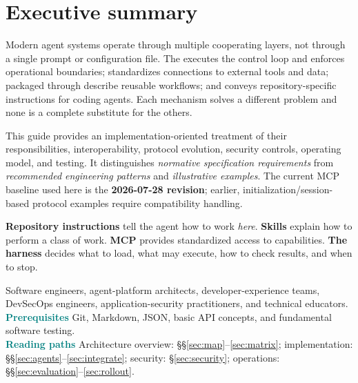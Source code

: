 \documentclass[11pt,letterpaper]{article}
\newcommand{\smallcaps}[1]{{\sffamily\bfseries\small\textcolor{Teal}{#1}}}
\begin{document}
\makedoctitle
\makedocsummary
\section*{Executive summary}
Modern agent systems operate through multiple cooperating layers, not through a single prompt or configuration file. The  executes the control loop and enforces operational boundaries;  standardizes connections to external tools and data;  packaged through  describe reusable workflows; and  conveys repository-specific instructions for coding agents. Each mechanism solves a different problem and none is a complete substitute for the others.\cite{agentsmd,agentskills,mcp2026,harnesslangchain}

This guide provides an implementation-oriented treatment of their responsibilities, interoperability, protocol evolution, security controls, operating model, and testing. It distinguishes \emph{normative specification requirements} from \emph{recommended engineering patterns} and \emph{illustrative examples}. The current MCP baseline used here is the \textbf{2026-07-28 revision}; earlier, initialization/session-based protocol examples require compatibility handling.\cite{mcp2026,mcpversion}

\begin{tipbox}
\textbf{Repository instructions} tell the agent how to work \emph{here}. \textbf{Skills} explain how to perform a class of work. \textbf{MCP} provides standardized access to capabilities. \textbf{The harness} decides what to load, what may execute, how to check results, and when to stop.
\end{tipbox}

\noindent\smallcaps{Intended readers} Software engineers, agent-platform architects, developer-experience teams, DevSecOps engineers, application-security practitioners, and technical educators.\\
\smallcaps{Prerequisites} Git, Markdown, JSON, basic API concepts, and fundamental software testing.\\
\smallcaps{Reading paths} Architecture overview: \S\S\ref{sec:map}--\ref{sec:matrix}; implementation: \S\S\ref{sec:agents}--\ref{sec:integrate}; security: \S\ref{sec:security}; operations: \S\S\ref{sec:evaluation}--\ref{sec:rollout}.

\newpage
\tableofcontents
\newpage
{}
\end{document}
